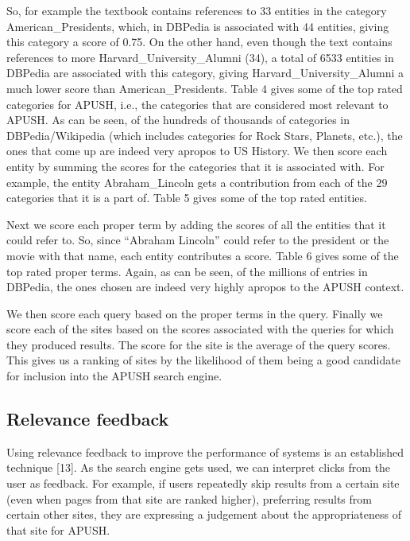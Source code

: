 \documentclass{acm_proc_article-sp}
\begin{document}
So, for example the textbook contains references to 33 entities in the category
American\_Presidents, which, in DBPedia is associated with 44 entities, giving
this category a score of 0.75. On the other hand, even though the text contains
references to more Harvard\_University\_Alumni (34), a total of 6533 entities in
DBPedia are associated with this category, giving Harvard\_University\_Alumni a
much lower score than American\_Presidents. Table 4 gives some of the top rated
categories for APUSH, i.e., the categories that are considered most relevant to
APUSH. As can be seen, of the hundreds of thousands of categories in
DBPedia/Wikipedia (which includes categories for Rock Stars, Planets, etc.), the
ones that come up are indeed very apropos to US History.           
We then score each entity by summing the scores for the categories that it is
associated with. For example, the entity Abraham\_Lincoln gets a contribution
from each of the 29 categories that it is a part of. Table 5 gives some of the
top rated entities. 

Next we score each proper term by adding the scores of all the entities that it
could refer to. So, since “Abraham Lincoln” could refer to the president or the
movie with that name, each entity contributes a score. Table 6 gives some of the
top rated proper terms. Again, as can be seen, of the millions of entries in
DBPedia, the ones chosen are indeed very highly apropos to the APUSH context. 

We then score each query based on the proper terms in the query. Finally we
score each of the sites based on the scores associated with the queries for
which they produced results. The score for the site is the average of the query
scores. This gives us a ranking of sites by the likelihood of them being a good
candidate for inclusion into the APUSH search engine. 


\subsection{Relevance feedback}

Using relevance feedback to improve the performance of systems is an established
technique [13]. As the search engine gets used, we can interpret clicks from the
user as feedback. For example, if users repeatedly skip results from a certain
site (even when pages from that site are ranked higher), preferring results from
certain other sites, they are expressing a judgement about the appropriateness
of that site for APUSH. 
\end{document}

